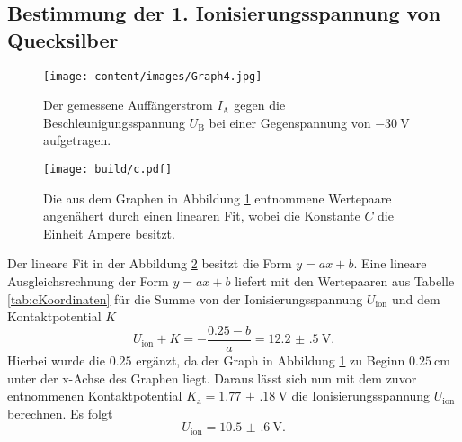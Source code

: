 \subsection{Bestimmung der 1. Ionisierungsspannung von Quecksilber}
\begin{figure}
	\centering
	\caption{Der gemessene Auffängerstrom $I_\text{A}$ gegen die Beschleunigungsspannung $U_\text{B}$ bei einer Gegenspannung von $\SI{-30}{\volt}$ aufgetragen.}
	\texttt{[image: content/images/Graph4.jpg]}
	\label{fig:c}
\end{figure}
\begin{figure}
	\centering
	\caption{Die aus dem Graphen in Abbildung \ref{fig:c} entnommene Wertepaare angenähert durch einen linearen Fit, wobei die Konstante $C$ die Einheit Ampere besitzt.}
	\texttt{[image: build/c.pdf]}
	\label{fig:cion}
\end{figure}
\begin{table}
	\caption{Die aus dem Graphen in Abbildung \ref{fig:c} entnommenen Wertepaare, wobei die Konstante $C$ die Einheit Ampere besitzt.}
	\centering
	
\end{table}
Der lineare Fit in der Abbildung \ref{fig:cion} besitzt die Form $y=a x + b$. Eine lineare Ausgleichsrechnung der Form $y=a x+b$ liefert mit den Wertepaaren aus Tabelle \ref{tab:cKoordinaten} für die Summe von der Ionisierungsspannung $U_\text{ion}$ und dem Kontaktpotential $K$
\begin{displaymath}
	U_\text{ion}+K=-\frac{0.25-b}{a}=\SI{12.2(5)}{\volt}\text{.}
\end{displaymath}
Hierbei wurde die $\num{0.25}$ ergänzt, da der Graph in Abbildung \ref{fig:c} zu Beginn $\SI{0.25}{\centi\meter}$ unter der x-Achse des Graphen liegt.
Daraus lässt sich nun mit dem zuvor entnommenen Kontaktpotential $K_\text{a}=\SI{1.77(18)}{\volt}$ die Ionisierungsspannung $U_\text{ion}$ berechnen. Es folgt
\begin{displaymath}
U_\text{ion}=\SI{10.5(6)}{\volt}\text{.}
\end{displaymath}

\begin{table}
	\caption{Die Ergebnisse aus der Auswertung.}
	\centering
	
	\label{tab:erg}
\end{table}
